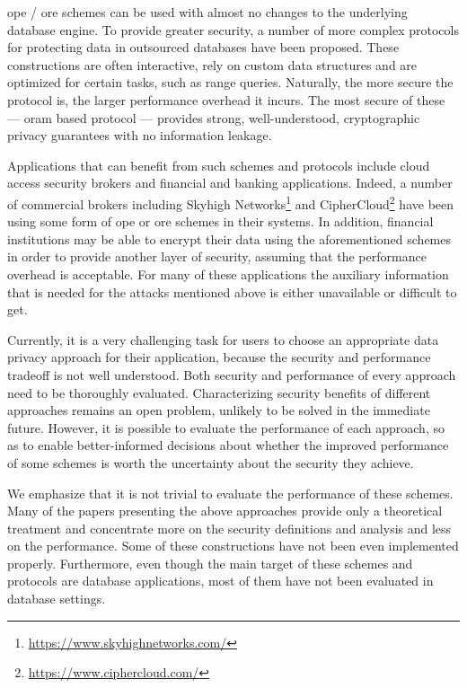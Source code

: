 	\acrshort{ope} / \acrshort{ore} schemes can be used with almost no changes to the underlying database engine.
	To provide greater security, a number of more complex protocols for protecting data in outsourced databases have been proposed.
	These constructions are often interactive, rely on custom data structures and are optimized for certain tasks, such as range queries.
	Naturally, the more secure the protocol is, the larger performance overhead it incurs.
	The most secure of these --- \acrfull{oram} based protocol --- provides strong, well-understood, cryptographic privacy guarantees with no information leakage.

	Applications that can benefit from such schemes and protocols include cloud access security brokers and financial and banking applications.
	Indeed, a number of commercial brokers including Skyhigh Networks\footnote{\url{https://www.skyhighnetworks.com/}} and CipherCloud\footnote{\url{https://www.ciphercloud.com/}} have been using some form of \acrshort{ope} or \acrshort{ore} schemes in their systems.
	In addition, financial institutions may be able to encrypt their data using the aforementioned schemes in order to provide another layer of security, assuming that the performance overhead is acceptable.
	For many of these applications the auxiliary information that is needed for the attacks mentioned above is either unavailable or difficult to get.

	Currently, it is a very challenging task for users to choose an appropriate data privacy approach for their application, because the security and performance tradeoff is not well understood.
	Both security and performance of every approach need to be thoroughly evaluated.
	Characterizing security benefits of different approaches remains an open problem, unlikely to be solved in the immediate future.
	However, it is possible to evaluate the performance of each approach, so as to enable better-informed decisions about whether the improved performance of some schemes is worth the uncertainty about the security they achieve.

	We emphasize that it is not trivial to evaluate the performance of these schemes.
	Many of the papers presenting the above approaches provide only a theoretical treatment and concentrate more on the security definitions and analysis and less on the performance.
	Some of these constructions have not been even implemented properly.
	Furthermore, even though the main target of these schemes and protocols are database applications, most of them have not been evaluated in database settings.

